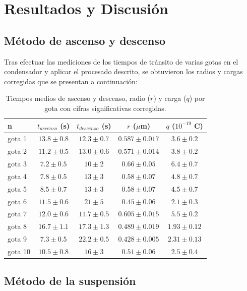 \documentclass[9pt,a4paper,twocolumn,twoside]{rho-class/rho}
\begin{document}
\section{Resultados y Discusión}
\subsection{Método de ascenso y descenso}

Tras efectuar las mediciones de los tiempos de tránsito de varias gotas en el condensador y aplicar el procesado descrito, se obtuvieron los radios y cargas corregidas que se presentan a continuación:

\begin{table}[hbt!]
\centering
\begin{tabular}{lcccc}
\hline
n & $t_{ascenso}$ (s) & $t_{descenso}$ (s) & $r$ ($\mu$m) & $q$ ($10^{-19}$ C) \\
\hline
gota 1  & $13.8 \pm 0.8$ & $12.3 \pm 0.7$ & $0.587 \pm 0.017$ & $3.6 \pm 0.2$ \\
gota 2  & $11.2 \pm 0.5$ & $13.0 \pm 0.6$ & $0.571 \pm 0.014$ & $3.8 \pm 0.2$ \\
gota 3  & $7.2 \pm 0.5$  & $10 \pm 2$      & $0.66 \pm 0.05$   & $6.4 \pm 0.7$ \\
gota 4  & $7.8 \pm 0.5$  & $13 \pm 3$      & $0.58 \pm 0.07$   & $4.8 \pm 0.7$ \\
gota 5  & $8.5 \pm 0.7$  & $13 \pm 3$      & $0.58 \pm 0.07$   & $4.5 \pm 0.7$ \\
gota 6  & $11.5 \pm 0.6$ & $21 \pm 5$      & $0.45 \pm 0.06$   & $2.1 \pm 0.3$ \\
gota 7  & $12.0 \pm 0.6$ & $11.7 \pm 0.5$ & $0.605 \pm 0.015$ & $5.5 \pm 0.2$ \\
gota 8  & $16.7 \pm 1.1$ & $17.3 \pm 1.3$ & $0.489 \pm 0.019$ & $1.93 \pm 0.12$ \\
gota 9  & $7.3 \pm 0.5$  & $22.2 \pm 0.5$ & $0.428 \pm 0.005$ & $2.31 \pm 0.13$ \\
gota 10 & $10.5 \pm 0.8$ & $16 \pm 3$      & $0.51 \pm 0.06$   & $2.5 \pm 0.4$ \\
\hline
\end{tabular}
\vspace{0.1cm}
\caption{Tiempos medios de ascenso y descenso, radio ($r$) y carga ($q$) por gota con cifras significativas corregidas.}
\label{tab:datos_redondeados}
\end{table}

\subsection{Método de la suspensión}
\end{document}
